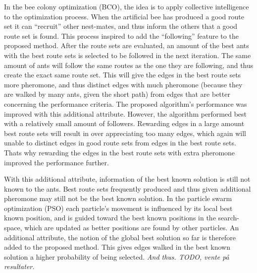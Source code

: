 In the bee colony optimization (BCO), the idea is to apply collective intelligence to the optimization process. When the artificial bee has produced a good route set it can ``recruit'' other nest-mates, and thus inform the others that a good route set is found. This process inspired to add the ``following'' feature to the proposed method. After the route sets are evaluated, an amount of the best ants with the best route sets is selected to be followed in the next iteration. The same amount of ants will follow the same routes as the one they are following, and thus create the exact same route set. This will give the edges in the best route sets more pheromone, and thus distinct edges with much pheromone (because they are walked by many ants, given the short path) from edges that are better concerning the performance criteria. The proposed algorithm's performance was improved with this additional attribute. However, the algorithm performed best with a relatively small amount of followers. Rewarding edges in a large amount best route sets will result in over appreciating too many edges, which again will unable to distinct edges in good route sets from edges in the best route sets. Thats why rewarding the edges in the best route sets with extra pheromone improved the performance further.  %


With this additional attribute, information of the best known solution is still not known to the ants. Best route sets frequently produced and thus given additional pheromone may still not be the best known solution. In the particle swarm optimization (PSO) each particle's movement is influenced by its local best known position, and is guided toward the best known positions in the search-space, which are updated as better positions are found by other particles. An additional attribute, the notion of the global best solution so far is therefore added to the proposed method. This gives edges walked in the best known solution a higher probability of being selected. \emph{\color{blue} And thus. TODO, vente på resultater.}

